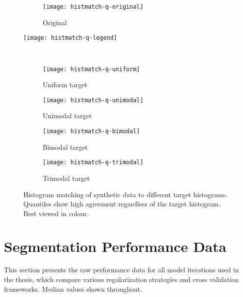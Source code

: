 \begin{figure}
  \centering
  \begin{subfigure}{\plotwidth}
    \texttt{[image: histmatch-q-original]}
    \caption{Original}
  \end{subfigure}
  \parbox[c]{\plotwidth}{\texttt{[image: histmatch-q-legend]}}\\
  \begin{subfigure}{\plotwidth}
    \texttt{[image: histmatch-q-uniform]}
    \caption{Uniform target}
  \end{subfigure}
  \begin{subfigure}{\plotwidth}
    \texttt{[image: histmatch-q-unimodal]}
    \caption{Unimodal target}
  \end{subfigure}
  \begin{subfigure}{\plotwidth}
    \texttt{[image: histmatch-q-bimodal]}
    \caption{Bimodal target}
  \end{subfigure}
  \begin{subfigure}{\plotwidth}
    \texttt{[image: histmatch-q-trimodal]}
    \caption{Trimodal target}
  \end{subfigure}
  \caption{Histogram matching of synthetic data to different target histograms.
    Quantiles show high agreement regardless of the target histogram.
    Best viewed in colour.}%
  \label{fig:hm-vs-he}
\end{figure}
\clearpage
\section{Segmentation Performance Data}
This section presents the raw performance data for all model iterations used in the thesis,
which compare various regularization strategies and cross validation frameworks.
Median values shown throughout.
\begin{singlespace}
  \centering
  \edef\tablistfun{\unexpanded{\foreach\cap/\file in }{\unexpanded\expandafter{\tablist}}}%
  \tablistfun{\begin{minipage}{\plotwidth}%
      {\centering\cap\par\vspace{0.5em}}\vspace{1em}%
  \end{minipage} }
\end{singlespace}
